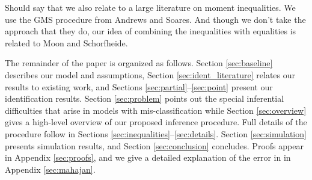 Should say that we also relate to a large literature on moment inequalities.
We use the GMS procedure from Andrews and Soares.
And though we don't take the approach that they do, our idea of combining the inequalities with equalities is related to Moon and Schorfheide.


The remainder of the paper is organized as follows.
Section \ref{sec:baseline} describes our model and assumptions, Section \ref{sec:ident_literature} relates our results to existing work, and Sections \ref{sec:partial}--\ref{sec:point} present our identification results.
Section \ref{sec:problem} points out the special inferential difficulties that arise in models with mis-classification while Section \ref{sec:overview} gives a high-level overview of our proposed inference procedure.
Full details of the procedure follow in Sections \ref{sec:inequalities}--\ref{sec:details}.
Section \ref{sec:simulation} presents simulation results, and Section \ref{sec:conclusion} concludes.
Proofs appear in Appendix \ref{sec:proofs}, and we give a detailed explanation of the error in \cite{Mahajan} in Appendix \ref{sec:mahajan}.


